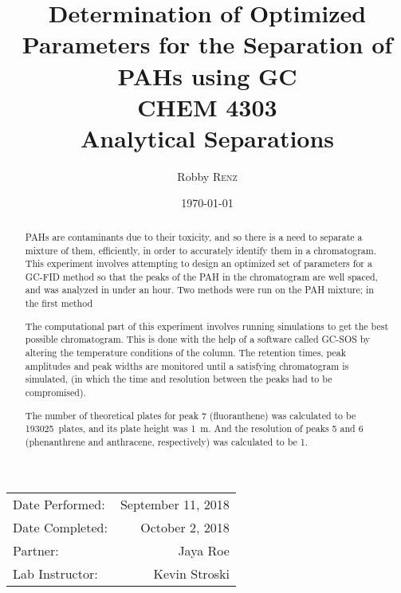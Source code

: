 \documentclass[a4paper, 12pt]{article}
\title{Determination of Optimized Parameters for the Separation of PAHs using GC \\ CHEM 4303 \\ Analytical Separations} %
\author{Robby \textsc{Renz}} %
\date{\today} %
\begin{document}
\maketitle %

\begin{center}
\begin{tabular}{l r}
Date Performed: & September 11, 2018 \\ %
Date Completed: & October 2, 2018 \\
Partner: & Jaya Roe \\ %
Lab Instructor: & Kevin Stroski %
\end{tabular}
\end{center}


\begin{abstract}
PAHs are contaminants due to their toxicity, and so there is a need to separate a mixture of them, efficiently, in order to accurately identify them in a chromatogram. This experiment involves attempting to design an optimized set of parameters for a GC-FID method so that the peaks of the PAH in the chromatogram are well spaced, and was analyzed in under an hour. Two methods were run on the PAH mixture; in the first method 

The computational part of this experiment involves running simulations to get the best possible chromatogram. This is done with the help of a software called GC-SOS\textsuperscript{\textregistered} by altering  the temperature conditions of the column. The retention times, peak amplitudes and peak widths are monitored until a satisfying chromatogram is simulated, (in which the time and resolution between the peaks had to be compromised).

The number of theoretical plates for peak 7 (fluoranthene) was calculated to be \SI{193025}{plates}, and its plate height was \SI{1}{m}. And the resolution of peaks 5 and 6 (phenanthrene and anthracene, respectively) was calculated to be \num{1}.

\end{abstract}

\newpage

\end{document}
